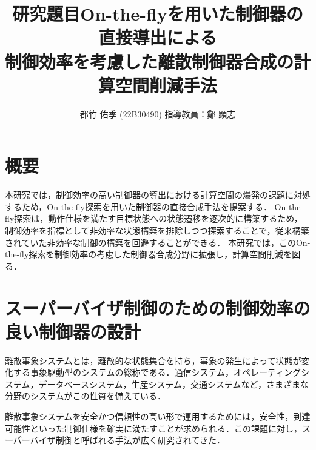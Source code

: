 \documentclass[11pt]{jarticle}
\begin{document}

\title{研究題目}
\title{On-the-flyを用いた制御器の直接導出による\\制御効率を考慮した離散制御器合成の計算空間削減手法}
\author{都竹 佑季 (22B30490) \;\; 指導教員：鄭 顕志}
\date{\empty} %
\maketitle %
\thispagestyle{fancy}


\section{概要} %
本研究では，制御効率の高い制御器の導出における計算空間の爆発の課題に対処するため，On-the-fly探索を用いた制御器の直接合成手法を提案する．
On-the-fly探索は，動作仕様を満たす目標状態への状態遷移を逐次的に構築するため，制御効率を指標として非効率な状態構築を排除しつつ探索することで，従来構築されていた非効率な制御の構築を回避することができる．
本研究では，このOn-the-fly探索を制御効率の考慮した制御器合成分野に拡張し，計算空間削減を図る．

\section{スーパーバイザ制御のための制御効率の良い制御器の設計}
離散事象システムとは，離散的な状態集合を持ち，事象の発生によって状態が変化する事象駆動型のシステムの総称である．通信システム，オペレーティングシステム，データベースシステム，生産システム，交通システムなど，さまざまな分野のシステムがこの性質を備えている．

離散事象システムを安全かつ信頼性の高い形で運用するためには，安全性，到達可能性といった制御仕様を確実に満たすことが求められる．この課題に対し，スーパーバイザ制御と呼ばれる手法が広く研究されてきた．
\end{document}

